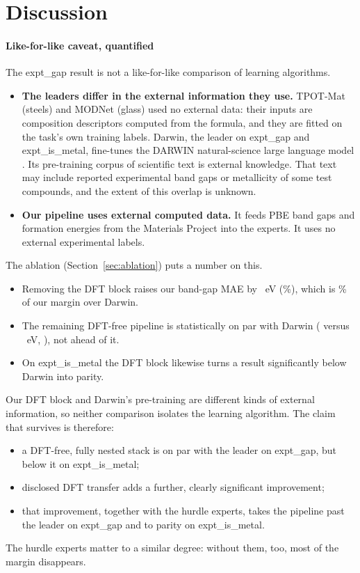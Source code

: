 \section{Discussion}
\label{sec:discussion}

\paragraph{Like-for-like caveat, quantified}
The expt\_gap result is not a like-for-like comparison of learning algorithms.
\begin{itemize}
\item \textbf{The leaders differ in the external information they use.} TPOT-Mat (steels) and MODNet (glass) used no external data: their inputs are composition descriptors computed from the formula, and they are fitted on the task's own training labels. Darwin, the leader on expt\_gap and expt\_is\_metal, fine-tunes the DARWIN natural-science large language model \citep{xie2023master,xie2023darwin}. Its pre-training corpus of scientific text is external knowledge. That text may include reported experimental band gaps or metallicity of some test compounds, and the extent of this overlap is unknown.
\item \textbf{Our pipeline uses external computed data.} It feeds PBE band gaps and formation energies from the Materials Project into the experts. It uses no external experimental labels.
\end{itemize}
The ablation (Section~\ref{sec:ablation}) puts a number on this.
\begin{itemize}
\item Removing the DFT block raises our band-gap MAE by \AblNoDftGapDelta~eV (\AblNoDftGapRel\%), which is \AblNoDftGapShareOfLeaderGain\% of our margin over Darwin.
\item The remaining DFT-free pipeline is statistically on par with Darwin (\AblNoDftGap{} versus \AtwoLeaderGap~eV, \AblNoDftGapVsLeaderPExpr), not ahead of it.
\item On expt\_is\_metal the DFT block likewise turns a result significantly below Darwin into parity.
\end{itemize}
Our DFT block and Darwin's pre-training are different kinds of external information, so neither comparison isolates the learning algorithm. The claim that survives is therefore:
\begin{itemize}
\item a DFT-free, fully nested stack is on par with the leader on expt\_gap, but below it on expt\_is\_metal;
\item disclosed DFT transfer adds a further, clearly significant improvement;
\item that improvement, together with the hurdle experts, takes the pipeline past the leader on expt\_gap and to parity on expt\_is\_metal.
\end{itemize}
The hurdle experts matter to a similar degree: without them, too, most of the margin disappears.

